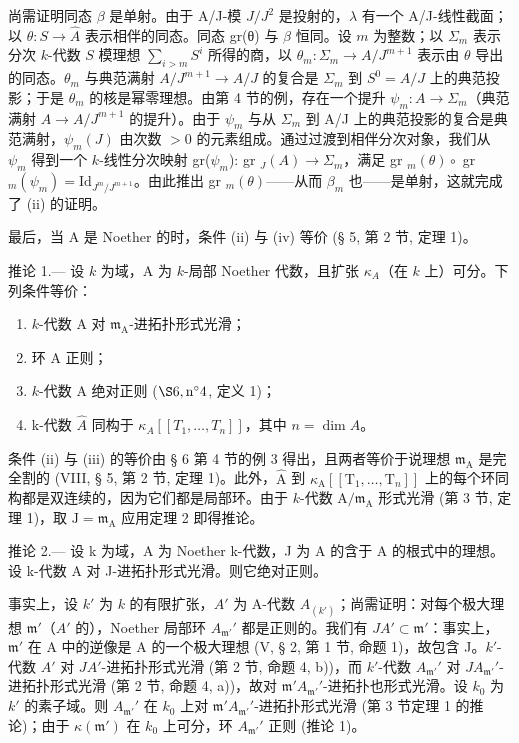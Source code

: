 尚需证明同态 \(\beta\) 是单射。由于 A/J-模 \(J/J^{2}\) 是投射的，\(\lambda\) 有一个 A/J-线性截面；以 \(\theta: S \to \widehat{A}\) 表示相伴的同态。同态 gr(θ) 与 \(\beta\) 恒同。设 \(m\) 为整数；以 \(\Sigma_{m}\) 表示分次 \(k\)-代数 \(S\) 模理想 \(\sum_{i > m} S^{i}\) 所得的商，以 \(\theta_{m}: \Sigma_{m} \to A/J^{m+1}\) 表示由 \(\theta\) 导出的同态。\(\theta_{m}\) 与典范满射 \(A/J^{m+1} \longrightarrow A/J\) 的复合是 \(\Sigma_{m}\) 到 \(S^{0} = A/J\) 上的典范投影；于是 \(\theta_{m}\) 的核是幂零理想。由第 4 节的例，存在一个提升 \(\psi_{m}: A \to \Sigma_{m}\)（典范满射 \(A \to A/J^{m+1}\) 的提升）。由于 \(\psi_{m}\) 与从 \(\Sigma_{m}\) 到 A/J 上的典范投影的复合是典范满射，\(\psi_{m}(J)\) 由次数 \(>0\) 的元素组成。通过过渡到相伴分次对象，我们从 \(\psi_{m}\) 得到一个 \(k\)-线性分次映射 gr(\(\psi_{m}\)): gr \(_{J}(A) \to \Sigma_{m}\)，满足 gr \(_{m}(\theta) \circ\) gr \(_{m}(\psi_{m}) = \text{Id}_{J^{m}/J^{m+1}}\)。由此推出 gr \(_{m}(\theta)\)——从而 \(\beta_{m}\) 也——是单射，这就完成了 (ii) 的证明。

最后，当 A 是 Noether 的时，条件 (ii) 与 (iv) 等价 (§ 5, 第 2 节, 定理 1)。

推论 1.--- 设 \(k\) 为域，A 为 \(k\)-局部 Noether 代数，且扩张 \(\kappa_{A}\)（在 \(k\) 上）可分。下列条件等价：

\begin{enumerate}
\def\labelenumi{(\roman{enumi})}
\item
  \(k\)-代数 A 对 \(\mathfrak{m}_{\mathrm{A}}\)-进拓扑形式光滑；
\item
  环 A 正则；
\item
  \(k\)-代数 A 绝对正则 (\(\S 6, \mathrm{n}^{\circ} 4\), 定义 1)；
\item
  k-代数 \(\hat{A}\) 同构于 \(\kappa_{A}[[T_{1},\ldots,T_{n}]]\)，其中 \(n=\dim A\)。
\end{enumerate}

条件 (ii) 与 (iii) 的等价由 § 6 第 4 节的例 3 得出，且两者等价于说理想 \(\mathfrak{m}_{\mathrm{A}}\) 是完全割的 (VIII, § 5, 第 2 节, 定理 1)。此外，\(\widehat{\mathrm{A}}\) 到 \(\kappa_{\mathrm{A}}[[\mathrm{T}_{1},\ldots,\mathrm{T}_{n}]]\) 上的每个环同构都是双连续的，因为它们都是局部环。由于 \(k\)-代数 \(\mathrm{A}/\mathfrak{m}_{\mathrm{A}}\) 形式光滑 (第 3 节, 定理 1)，取 \(\mathrm{J}=\mathfrak{m}_{\mathrm{A}}\) 应用定理 2 即得推论。

推论 2.--- 设 k 为域，A 为 Noether k-代数，J 为 A 的含于 A 的根式中的理想。设 k-代数 A 对 J-进拓扑形式光滑。则它绝对正则。

事实上，设 \(k'\) 为 \(k\) 的有限扩张，\(A'\) 为 A-代数 \(A_{(k')}\)；尚需证明：对每个极大理想 \(\mathfrak{m}'\)（\(A'\) 的），Noether 局部环 \(A_{\mathfrak{m}'}'\) 都是正则的。我们有 \(JA' \subset \mathfrak{m}'\)：事实上，\(\mathfrak{m}'\) 在 A 中的逆像是 A 的一个极大理想 (V, § 2, 第 1 节, 命题 1)，故包含 J。\(k'\)-代数 \(A'\) 对 \(JA'\)-进拓扑形式光滑 (第 2 节, 命题 4, b))，而 \(k'\)-代数 \(A_{\mathfrak{m}'}'\) 对 \(JA_{\mathfrak{m}'}'\)-进拓扑形式光滑 (第 2 节, 命题 4, a))，故对 \(\mathfrak{m}'A_{\mathfrak{m}'}'\)-进拓扑也形式光滑。设 \(k_0\) 为 \(k'\) 的素子域。则 \(A_{\mathfrak{m}'}'\) 在 \(k_0\) 上对 \(\mathfrak{m}'A_{\mathfrak{m}'}'\)-进拓扑形式光滑 (第 3 节定理 1 的推论)；由于 \(\kappa(\mathfrak{m}')\) 在 \(k_0\) 上可分，环 \(A_{\mathfrak{m}'}'\) 正则 (推论 1)。

